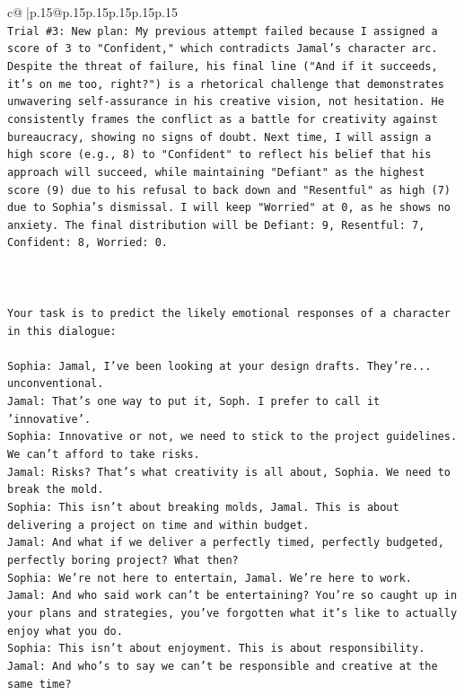 \documentclass{article}
\begin{document}
{\begin{supertabular}{c@{$\;$}|p{.15\linewidth}@{}p{.15\linewidth}p{.15\linewidth}p{.15\linewidth}p{.15\linewidth}p{.15\linewidth}}
{{{\\ 
\texttt{Trial \#3: New plan: My previous attempt failed because I assigned a score of 3 to "Confident," which contradicts Jamal's character arc. Despite the threat of failure, his final line ("And if it succeeds, it's on me too, right?") is a rhetorical challenge that demonstrates unwavering self{-}assurance in his creative vision, not hesitation. He consistently frames the conflict as a battle for creativity against bureaucracy, showing no signs of doubt. Next time, I will assign a high score (e.g., 8) to "Confident" to reflect his belief that his approach will succeed, while maintaining "Defiant" as the highest score (9) due to his refusal to back down and "Resentful" as high (7) due to Sophia's dismissal. I will keep "Worried" at 0, as he shows no anxiety. The final distribution will be Defiant: 9, Resentful: 7, Confident: 8, Worried: 0.} \\
\\ 
\\ 
\\ 
\texttt{Your task is to predict the likely emotional responses of a character in this dialogue:} \\
\\ 
\texttt{Sophia: Jamal, I've been looking at your design drafts. They're... unconventional.} \\
\texttt{Jamal: That's one way to put it, Soph. I prefer to call it 'innovative'.} \\
\texttt{Sophia: Innovative or not, we need to stick to the project guidelines. We can't afford to take risks.} \\
\texttt{Jamal: Risks? That's what creativity is all about, Sophia. We need to break the mold.} \\
\texttt{Sophia: This isn't about breaking molds, Jamal. This is about delivering a project on time and within budget.} \\
\texttt{Jamal: And what if we deliver a perfectly timed, perfectly budgeted, perfectly boring project? What then?} \\
\texttt{Sophia: We're not here to entertain, Jamal. We're here to work.} \\
\texttt{Jamal: And who said work can't be entertaining? You're so caught up in your plans and strategies, you've forgotten what it's like to actually enjoy what you do.} \\
\texttt{Sophia: This isn't about enjoyment. This is about responsibility.} \\
\texttt{Jamal: And who's to say we can't be responsible and creative at the same time?} \\
}}}
\end{supertabular}}
\end{document}
